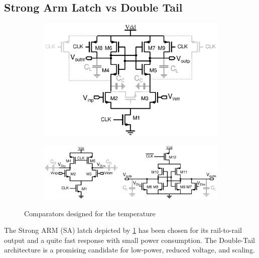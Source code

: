     \subsection{Strong Arm Latch vs Double Tail} %
\begin{figure}[htp]
    \centering
    \begin{subfigure}[b]{0.36\textwidth}
        \centering
        \includegraphics[width=\textwidth]{Chapter7/Figs/sa_designed.eps}
        \label{fig:sa_designed}
    \end{subfigure}
    \begin{subfigure}[b]{0.62\textwidth}
        \centering
        \includegraphics[width=\textwidth]{Chapter7/Figs/dtl_designed.eps}
        \label{fig:dtl_designed}
    \end{subfigure}
    \caption{Comparators designed for the temperature}
    \label{fig:cmp_designed}
\end{figure}

The Strong ARM (SA) latch depicted by \figurename\ref{fig:sa_designed} has been chosen for its rail-to-rail output and a quite fast response with small power consumption. The Double-Tail architecture is a promising candidate for low-power, reduced voltage, and scaling.
